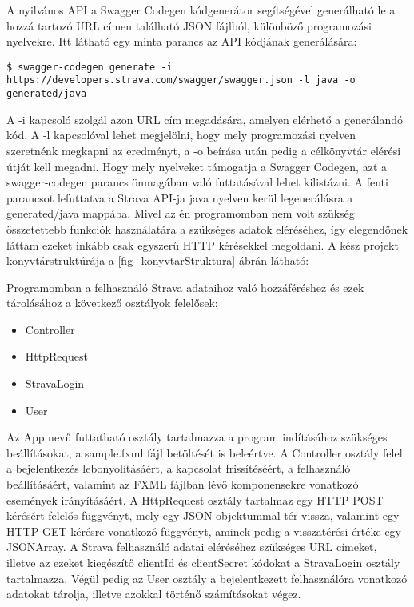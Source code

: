 A nyilvános API a Swagger Codegen kódgenerátor segítségével generálható le a hozzá tartozó URL címen található JSON fájlból, különböző programozási nyelvekre. Itt látható egy minta parancs az API kódjának generálására: 

\begin{verbatim}
$ swagger-codegen generate -i https://developers.strava.com/swagger/swagger.json -l java -o generated/java 
\end{verbatim}

A -i kapcsoló szolgál azon URL cím megadására, amelyen elérhető a generálandó kód. A -l kapcsolóval lehet megjelölni, hogy mely programozási nyelven szeretnénk megkapni az eredményt, a -o beírása után pedig a célkönyvtár elérési útját kell megadni. Hogy mely nyelveket támogatja a Swagger Codegen, azt a swagger-codegen parancs önmagában való futtatásával lehet kilistázni. A fenti parancsot lefuttatva a Strava API-ja java nyelven kerül legenerálásra a generated/java mappába. Mivel az én programomban nem volt szükség összetettebb funkciók használatára a szükséges adatok eléréséhez, így elegendőnek láttam ezeket inkább csak egyszerű HTTP kérésekkel megoldani. A kész projekt könyvtárstruktúrája a \ref{fig_konyvtarStruktura} ábrán látható: 



Programomban a felhasználó Strava adataihoz való hozzáféréshez és ezek tárolásához a következő osztályok felelősek: 

\begin{itemize}
\item Controller 
\item HttpRequest
\item StravaLogin 
\item User
\end{itemize}
 

Az App nevű futtatható osztály tartalmazza a program indításához szükséges beállításokat, a sample.fxml fájl betöltését is beleértve. A Controller osztály felel a bejelentkezés lebonyolításáért, a kapcsolat frissítéséért, a felhasználó beállításáért, valamint az FXML fájlban lévő komponensekre vonatkozó események irányításáért. A HttpRequest osztály tartalmaz egy HTTP POST kérésért felelős függvényt, mely egy JSON objektummal tér vissza, valamint egy HTTP GET kérésre vonatkozó függvényt, aminek pedig a visszatérési értéke egy JSONArray. A Strava felhasználó adatai eléréséhez szükséges URL címeket, illetve az ezeket kiegészítő clientId és clientSecret kódokat a StravaLogin osztály tartalmazza. Végül pedig az User osztály a bejelentkezett felhasználóra vonatkozó adatokat tárolja, illetve azokkal történő számításokat végez. 

